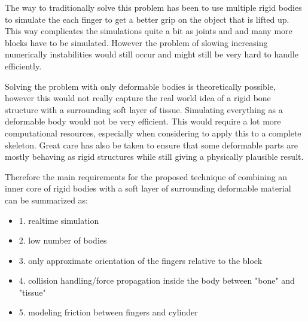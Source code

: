 The way to traditionally solve this problem has been to use multiple rigid bodies to simulate the each finger to get a better grip on the object that is lifted up. This way complicates the simulations quite a bit as joints and and many more blocks have to be simulated. However the problem of slowing increasing numerically instabilities would still occur and might still be very hard to handle efficiently.

Solving the problem with only deformable bodies is theoretically possible, however this would not really capture the real world idea of a rigid bone structure with a surrounding soft layer of tissue. Simulating everything as a deformable body would not be very efficient. This would require a lot more computational resources, especially when considering to apply this to a complete skeleton. Great care has also be taken to ensure that some deformable parts are mostly behaving as rigid structures while still giving a physically plausible result.

Therefore the main requirements for the proposed technique of combining an inner core of rigid bodies with a soft layer of surrounding deformable material can be summarized as:

\begin{itemize}
\item 1. realtime simulation
\item	2. low number of bodies
\item 3. only approximate orientation of the fingers relative to the block
\item 4. collision handling/force propagation inside the body between "bone" and "tissue"
\item 5. modeling friction between fingers and cylinder
\end{itemize}